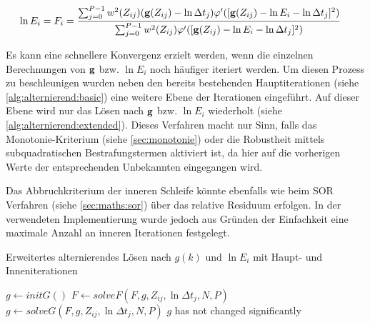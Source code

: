\begin{align}
    \label{eq:f_i:robust}
    \ln E_i = F_i &= \frac{
        \sum_{j=0}^{P-1} 
            w^2(Z_{ij})
            (\mathbf g(Z_{ij})-\ln \Delta t_j)
            \varphi'(
                [\mathbf g(Z_{ij})-\ln E_i - \ln \Delta t_j]^2
            )
    }
    {
        \sum_{j=0}^{P-1} 
            w^2(Z_{ij})
            \varphi'(
                [\mathbf g(Z_{ij})-\ln E_i - \ln \Delta t_j]^2
            )
    }
\end{align}


Es kann eine schnellere Konvergenz erzielt werden, wenn die einzelnen Berechnungen von $\mathbf g$ bzw. $\ln E_i$ noch häufiger iteriert werden. Um diesen Prozess zu beschleunigen wurden neben den bereits bestehenden Hauptiterationen (siehe \autoref{alg:alternierend:basic}) eine weitere Ebene der Iterationen eingeführt. Auf dieser Ebene wird nur das Lösen nach $\mathbf g$ bzw. $\ln E_i$ wiederholt (siehe \autoref{alg:alternierend:extended}). Dieses Verfahren macht nur Sinn, falls das Monotonie-Kriterium (siehe \autoref{sec:monotonie}) oder die Robustheit mittels subquadratischen Bestrafungstermen aktiviert ist, da hier auf die vorherigen Werte der entsprechenden Unbekannten eingegangen wird. 

Das Abbruchkriterium der inneren Schleife könnte ebenfalls wie beim \gls{SOR} Verfahren (siehe \autoref{sec:maths:sor}) über das relative Residuum erfolgen. In der verwendeten Implementierung wurde jedoch aus Gründen der Einfachkeit eine maximale Anzahl an inneren Iterationen festgelegt.

\begin{Algorithmus} %
\caption{Erweitertes alternierendes Lösen nach $g(k)$ und $\ln E_i$ mit Haupt- und Inneniterationen}
\label{alg:alternierend:extended}
\begin{algorithmic}
	\State $g \gets initG()$
		\Repeat
		    \State $F \gets solveF(F, g, Z_{ij}, \ln \Delta t_j, N, P)$ 
		\Repeat
			\State $g \gets solveG(F, g, Z_{ij}, \ln \Delta t_j, N, P)$
		\Until$g$ has not changed significantly
	\EndWhile
	\State \Return [$g$, $F$]
\EndFunction
\end{algorithmic}
\end{Algorithmus}






